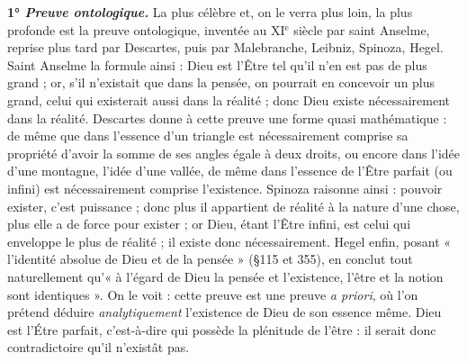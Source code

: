 \vspace{0.24cm}
{\footnotesize 
\textbf{1° \textit {\textsf{Preuve ontologique.}}} La plus célèbre et, on le verra plus loin, la plus
profonde est la preuve ontologique, inventée au {\footnotesize XI}$^\text{e}$ siècle par saint Anselme,
reprise plus tard par Descartes, puis par Malebranche, Leibniz,
Spinoza, Hegel. Saint Anselme la formule ainsi : Dieu est l’Être tel qu’il
n’en est pas de plus grand ; or, s’il n'existait que dans la pensée, on pourrait
en concevoir un plus grand, celui qui existerait aussi dans la réalité ; donc
Dieu existe nécessairement dans la réalité. Descartes donne à cette preuve
une forme quasi mathématique : de même que dans l’essence d’un triangle
est nécessairement comprise sa propriété d’avoir la somme de ses angles
égale à deux droits, ou encore dans l’idée d’une montagne, l’idée d’une vallée,
de même dans l'essence de l'Être parfait (ou infini) est nécessairement
comprise l'existence. Spinoza raisonne ainsi : pouvoir exister, c’est puissance ;
donc plus il appartient de réalité à la nature d'une chose, plus
elle a de force pour exister ; or Dieu, étant l'Être infini, est celui qui enveloppe
le plus de réalité ; il existe donc nécessairement. Hegel enfin, posant
« l'identité absolue de Dieu et de la pensée » (\S 115 et 355), en conclut tout
naturellement qu’« à l’égard de Dieu la pensée et l'existence, l’être et la
notion sont identiques ». On le voit : cette preuve est une preuve {\it a priori},
où l’on prétend déduire {\it analytiquement} l'existence de Dieu de son essence
même. Dieu est l’Étre parfait, c’est-à-dire qui possède la plénitude de
l'être : il serait donc contradictoire qu'il n’existât pas.

}
